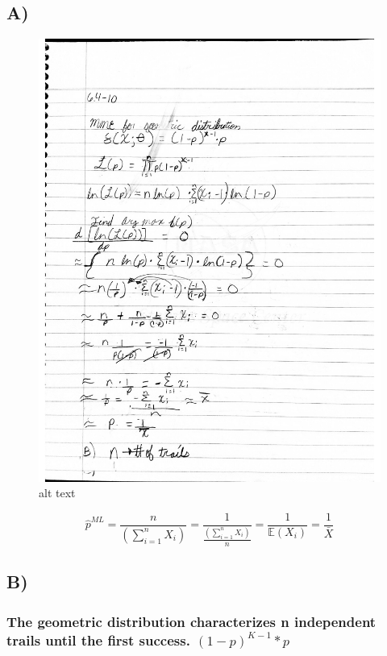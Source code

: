 \documentclass[11pt]{article}
\makeatletter
\def\maxwidth{\ifdim\Gin@nat@width>\linewidth\linewidth
    \else\Gin@nat@width\fi}
\let\Oldincludegraphics\includegraphics
\renewcommand{\includegraphics}[1]{\Oldincludegraphics[width=.8\maxwidth]{#1}}
\makeatother
\begin{document}
    \hypertarget{a}{%
\subsection{A)}\label{a}}

    \begin{figure}
\centering
\includegraphics{images/solution4.png}
\caption{alt text}
\end{figure}

    \[\hat{p}^{ML}=\frac{n}{\left(\sum_{i=1}^{n}{X}_{i} \right)} = \frac{1}{\frac{\left(\sum_{i=1}^{n}{X}_{i} \right)}{n}} =\frac{1}{\mathbb{E}(X_i)} =\frac{1}{\bar{X}}\]

    \hypertarget{b}{%
\subsection{B)}\label{b}}

\hypertarget{the-geometric-distribution-characterizes-n-independent-trails-until-the-first-success.-1-pk-1p}{%
\subsubsection{\texorpdfstring{The geometric distribution characterizes
n independent trails until the first success.
\((1-p)^{K-1}*p\)}{The geometric distribution characterizes n independent trails until the first success. (1-p)\^{}\{K-1\}*p}}\label{the-geometric-distribution-characterizes-n-independent-trails-until-the-first-success.-1-pk-1p}}
\end{document}
